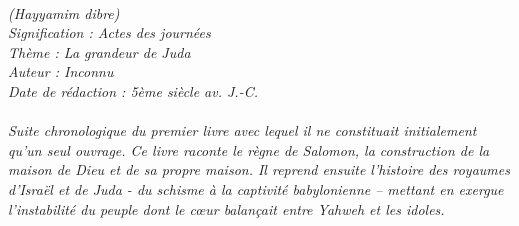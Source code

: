 \BFont
\noindent\hrulefill
{\footnotesize
\textit{
\bigskip
{\centering{}
\\(Hayyamim dibre)
\\Signification : Actes des journées
\\Thème : La grandeur de Juda
\\Auteur : Inconnu
\\Date de rédaction : 5ème siècle av. J.-C.\\}
}
\textit{
\\Suite chronologique du premier livre avec lequel il ne constituait initialement qu’un seul ouvrage. Ce livre raconte le règne de Salomon, la construction de la maison de Dieu et de sa propre maison. Il reprend ensuite l’histoire des royaumes d’Israël et de Juda - du schisme à la captivité babylonienne – mettant en exergue l’instabilité du peuple dont le cœur balançait entre Yahweh et les idoles.\bigskip
}
}
\par\nobreak\noindent\hrulefill
